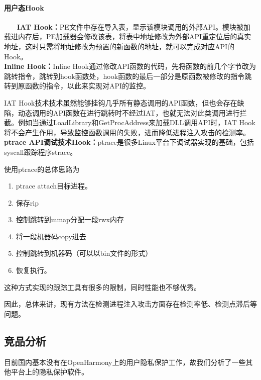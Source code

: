 \documentclass[12pt,a4paper]{ctexart}
\begin{document}
\paragraph{用户态Hook}
~~~\newline
\textbf{IAT Hook：}PE文件中存在导入表，显示该模块调用的外部API。模块被加载进内存后，PE加载器会修改该表，将表中地址修改为外部API重定位后的真实地址，这时只需将地址修改为预置的新函数的地址，就可以完成对应API的Hook。\\
\textbf{Inline Hook：}Inline Hook通过修改API函数的代码，先将函数的前几个字节改为跳转指令，跳转到hook函数处，hook函数的最后一部分是原函数被修改的指令跳转到原函数的指令，以此来实现对API的监控。


IAT Hook技术技术虽然能够挂钩几乎所有静态调用的API函数，但也会存在缺陷，动态调用的API函数在进行跳转时不经过IAT，也就无法对此类调用进行拦截。例如当通过LoadLibrary和GetProcAddress来加载DLL调用API时，IAT Hook将不会产生作用，导致监控函数调用的失败，进而降低进程注入攻击的检测率。\\
\textbf{ptrace API调试技术Hook：}ptrace是很多Linux平台下调试器实现的基础，包括syscall跟踪程序strace。


使用ptrace的总体思路为
\begin{enumerate}
  \item ptrace attach目标进程。
        \item 保存rip
        \item 控制跳转到mmap分配一段rwx内存
        \item 将一段机器码copy进去
        \item 控制跳转到机器码（可以以bin文件的形式）
        \item 恢复执行。
\end{enumerate}


这种方式实现的跟踪工具有很多的限制，同时性能也不够优秀。


因此，总体来讲，现有方法在检测进程注入攻击方面存在检测率低、检测点滞后等问题。

\subsection{竞品分析}
目前国内基本没有在OpenHarmony上的用户隐私保护工作，故我们分析了一些其他平台上的隐私保护软件。
\end{document}
